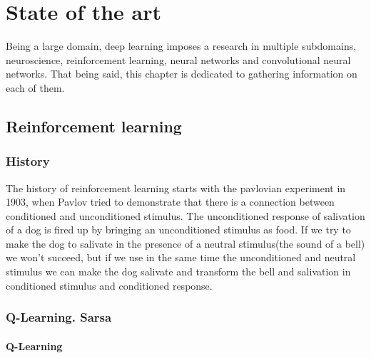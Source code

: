 \chapter{State of the art}
\label{chapter:state}

Being a large domain, deep learning imposes a research in multiple subdomains, neuroscience, reinforcement learning, neural networks and convolutional neural networks. That being said, this chapter is dedicated to gathering information on each of them.

\section{Reinforcement learning}
\label{sec:reinforcement}

\subsection{History}
The history of reinforcement learning starts with the pavlovian experiment\cite{pavlov} in 1903, when Pavlov tried to demonstrate that there is a connection between conditioned and unconditioned stimulus. The unconditioned response of salivation of a dog is fired up by bringing an unconditioned stimulus as food. If we try to make the dog to salivate in the presence of a neutral stimulus(the sound of a bell) we won't succeed, but if we use in the same time the unconditioned and neutral stimulus we can make the dog salivate and transform the bell and salivation in conditioned stimulus and conditioned response.

\subsection{Q-Learning. Sarsa}
\label{qlearning-sarsa}

\subsubsection{Q-Learning}
\label{qlearning}